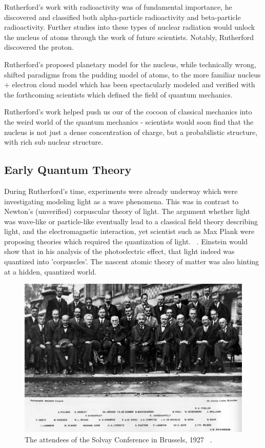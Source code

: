 Rutherford's work with radioactivity was of fundamental importance, he
discovered and classified both alpha-particle radioactivity and beta-particle
radioactivity. Further studies into these types of nuclear radiation would
unlock the nucleus of atoms through the work of future scientists. Notably,
Rutherford discovered the proton.

Rutherford's proposed planetary model for the nucleus, while technically wrong,
shifted paradigms from the pudding model of  atoms, to the more familiar nucleus
+ electron cloud model which has been spectacularly modeled and verified with
the forthcoming scientists which defined the field of quantum mechanics.

Rutherford's work helped push us our of the cocoon of classical mechanics into
the weird world of the quantum mechanics - scientists would soon find that the
nucleus is not just a dense concentration of charge, but a probabilistic
structure, with rich sub nuclear structure.

\clearpage
\subsection{Early Quantum Theory}

During Rutherford's time, experiments were already underway which were
investigating modeling light as a wave phenomena. This was in contrast to
Newton's (unverified) corpuscular theory of light. The argument whether light
was wave-like or particle-like eventually lead to a classical field theory
describing light, and the electromagnetic interaction, yet scientist such as Max
Plank were proposing theories which required the quantization of light.
~\needcite{}. Einstein would show that in his analysis of the photoelectric
effect, that light indeed was quantized into 'corpuscles'. The nascent atomic
theory of matter was also hinting at a hidden, quantized world.

\begin{figure}
	\centering
	\includegraphics[width=\linewidth]{figures/solvay.jpg}
	\caption{
		The attendees of the Solvay Conference in Brussels, 1927
		~\cite{BenjaminCroupie1927}.
	}
	\label{fig:solvay}
\end{figure}

